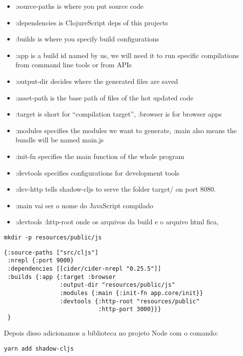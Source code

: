 \documentclass[11pt]{article}
\begin{document}
\begin{itemize}
\item :source-paths is where you put source code
\item :dependencies is ClojureScript deps of this projects
\item :builds is where you specify build configurations
\item :app is a build id named by us, we will need it to run specific compilations from command line tools or from APIs
\item :output-dir decides where the generated files are saved
\item :asset-path is the base path of files of the hot updated code
\item :target is short for “compilation target”, :browser is for browser apps
\item :modules specifies the modules we want to generate, :main also means the bundle will be named main.js
\item :init-fn specifies the main function of the whole program
\item :devtools specifies configurations for development tools
\item :dev-http tells shadow-cljs to serve the folder target/ on port 8080.

\item :main vai ser o nome do JavaScript compilado
\item :devtools :http-root onde os arquivos da build e o arquivo html fica,
\end{itemize}


\begin{verbatim}
mkdir -p resources/public/js
\end{verbatim}


\begin{verbatim}
{:source-paths ["src/cljs"]
 :nrepl {:port 9000}
 :dependencies [[cider/cider-nrepl "0.25.5"]]
 :builds {:app {:target :browser
                :output-dir "resources/public/js"
                :modules {:main {:init-fn app.core/init}}
                :devtools {:http-root "resources/public"
                           :http-port 3000}}}
 }

\end{verbatim}

Depois disso adicionamos a biblioteca no projeto Node com o comando:

\begin{verbatim}
yarn add shadow-cljs

\end{verbatim}
\end{document}
